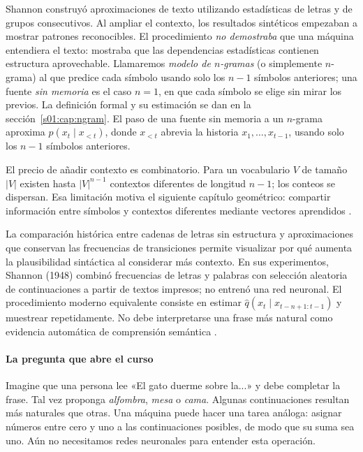 Shannon construyó aproximaciones de texto utilizando estadísticas de
letras y de grupos consecutivos. Al ampliar el contexto, los resultados
sintéticos empezaban a mostrar patrones reconocibles. El procedimiento
\emph{no demostraba} que una máquina entendiera el texto: mostraba que
las dependencias estadísticas contienen estructura aprovechable.
Llamaremos \emph{modelo de $n$-gramas} (o simplemente $n$-grama) al que predice
cada símbolo usando solo los $n-1$ símbolos anteriores; una fuente
\emph{sin memoria} es el caso $n=1$, en que cada símbolo se elige sin mirar los
previos. La definición formal y su estimación se dan en la
sección~\ref{s01:cap:ngram}. El paso de una fuente sin memoria a un $n$-grama
aproxima $p(x_t\mid x_{<t})$, donde $x_{<t}$ abrevia la historia
$x_1,\ldots,x_{t-1}$, usando solo los $n-1$ símbolos anteriores.

El precio de añadir contexto es combinatorio. Para un vocabulario $V$ de tamaño
$|V|$ existen hasta $|V|^{n-1}$ contextos diferentes de longitud $n-1$;
los conteos se dispersan. Esa limitación motiva el siguiente capítulo
geométrico: compartir información entre símbolos y contextos diferentes
mediante vectores aprendidos \citep{bengio2003neural,mikolov2013efficient}.
\begin{ejemplo}
La comparación histórica entre cadenas de letras sin estructura y
aproximaciones que conservan las frecuencias de transiciones permite
visualizar por qué aumenta la plausibilidad sintáctica al considerar
más contexto. En sus experimentos, Shannon (1948) combinó frecuencias
de letras y palabras con selección aleatoria de continuaciones a partir
de textos impresos; no entrenó una red neuronal. El procedimiento
moderno equivalente consiste en estimar $\widehat q(x_t\mid x_{t-n+1:t-1})$
y muestrear repetidamente. No debe interpretarse una frase más natural
como evidencia automática de comprensión semántica
\citep{shannon1948,shannon1951}.
\end{ejemplo}

\paragraph{La pregunta que abre el curso}
Imagine que una persona lee «El gato duerme sobre la...» y debe completar la frase. Tal vez proponga \emph{alfombra}, \emph{mesa} o \emph{cama}. Algunas continuaciones resultan más naturales que otras. Una máquina puede hacer una tarea análoga: asignar números entre cero y uno a las continuaciones posibles, de modo que su suma sea uno. Aún no necesitamos redes neuronales para entender esta operación.

